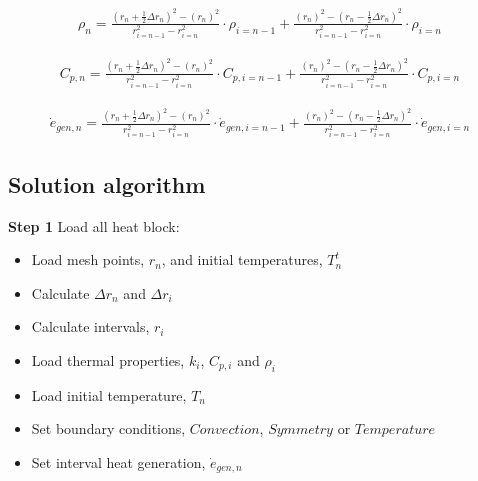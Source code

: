 \documentclass[11pt,letterpaper,titlepage]{article}
\newcommand{\half}{\frac{1}{2}}
\begin{document}
\begin{equation*}
\begin{aligned}
\rho_n=\frac{(r_n+\half \Delta r_n)^2  -  (r_n)^2}{r_{i=n-1}^2-r_{i=n}^2} \cdot \rho_{i=n-1}
      +\frac{(r_n)^2  -  (r_n-\half \Delta r_n)^2}{r_{i=n-1}^2-r_{i=n}^2} \cdot \rho_{i=n}
\end{aligned}
\end{equation*}

\begin{equation*}
\begin{aligned}
C_{p,n}=\frac{(r_n+\half \Delta r_n)^2  -  (r_n)^2}{r_{i=n-1}^2-r_{i=n}^2} \cdot C_{p,i=n-1}
      +\frac{(r_n)^2  -  (r_n-\half \Delta r_n)^2}{r_{i=n-1}^2-r_{i=n}^2} \cdot C_{p,i=n}
\end{aligned}
\end{equation*}

\begin{equation*}
\begin{aligned}
\dot{e}_{gen,n}=\frac{(r_n+\half \Delta r_n)^2  -  (r_n)^2}{r_{i=n-1}^2-r_{i=n}^2} \cdot \dot{e}_{gen,i=n-1}
               +\frac{(r_n)^2  -  (r_n-\half \Delta r_n)^2}{r_{i=n-1}^2-r_{i=n}^2} \cdot \dot{e}_{gen,i=n}
\end{aligned}
\end{equation*}






\newpage
\subsection{Solution algorithm}
\vspace{0.5cm}\noindent
\textbf{Step 1}\newline
Load all heat block:
\begin{itemize}
\item Load mesh points, $r_n$, and initial temperatures, $T_n^t$
\item Calculate $\Delta r_n$ and $\Delta r_i$
\item Calculate intervals, $r_i$
\item Load thermal properties, $k_i$, $C_{p,i}$ and $\rho_i$
\item Load initial temperature, $T_n$
\item Set boundary conditions, $Convection$, $Symmetry$ or $Temperature$
\item Set interval heat generation, $\dot{e}_{gen,n}$
\end{itemize}
\end{document}
